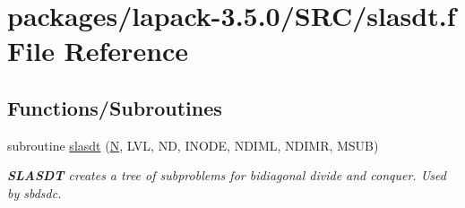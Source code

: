 \hypertarget{slasdt_8f}{}\section{packages/lapack-\/3.5.0/\+S\+R\+C/slasdt.f File Reference}
\label{slasdt_8f}
\subsection*{Functions/\+Subroutines}
\begin{DoxyCompactItemize}
\item 
subroutine \hyperlink{group__auxOTHERauxiliary_gae747f83ac11f2283d1d3f8b09d7a1138}{slasdt} (\hyperlink{polmisc_8c_a0240ac851181b84ac374872dc5434ee4}{N}, L\+V\+L, N\+D, I\+N\+O\+D\+E, N\+D\+I\+M\+L, N\+D\+I\+M\+R, M\+S\+U\+B)
\begin{DoxyCompactList}\small\item\em {\bfseries S\+L\+A\+S\+D\+T} creates a tree of subproblems for bidiagonal divide and conquer. Used by sbdsdc. \end{DoxyCompactList}\end{DoxyCompactItemize}
